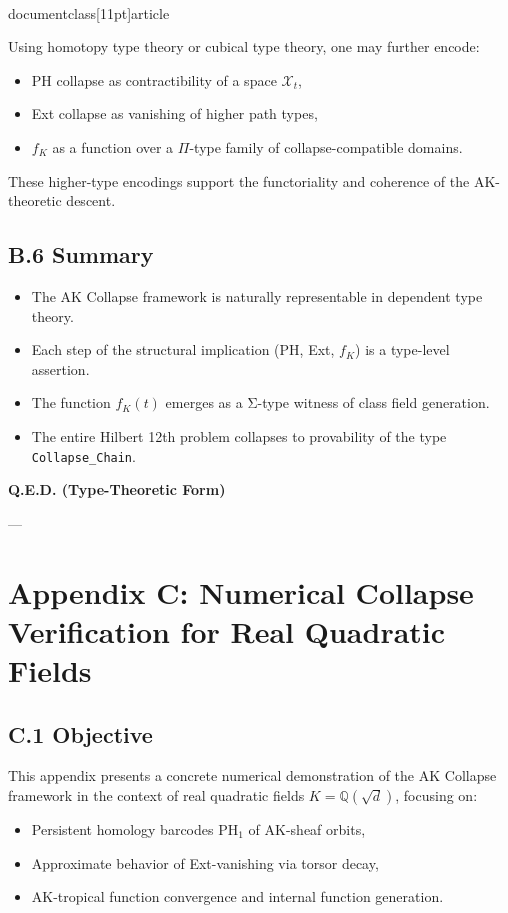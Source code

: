 \\documentclass[11pt]{article}
\begin{document}
Using homotopy type theory or cubical type theory, one may further encode:

\begin{itemize}
    \item PH collapse as contractibility of a space \( \mathcal{X}_t \),
    \item Ext collapse as vanishing of higher path types,
    \item \( f_K \) as a function over a \(\Pi\)-type family of collapse-compatible domains.
\end{itemize}

These higher-type encodings support the functoriality and coherence of the AK-theoretic descent.

\subsection*{B.6 Summary}

\begin{itemize}
    \item The AK Collapse framework is naturally representable in dependent type theory.
    \item Each step of the structural implication (PH, Ext, \( f_K \)) is a type-level assertion.
    \item The function \( f_K(t) \) emerges as a Σ-type witness of class field generation.
    \item The entire Hilbert 12th problem collapses to provability of the type \texttt{Collapse\_Chain}.
\end{itemize}

\begin{center}
\LARGE \textbf{Q.E.D. (Type-Theoretic Form)}
\end{center}


---


\section*{Appendix C: Numerical Collapse Verification for Real Quadratic Fields}

\subsection*{C.1 Objective}

This appendix presents a concrete numerical demonstration of the AK Collapse framework  
in the context of real quadratic fields \( K = \mathbb{Q}(\sqrt{d}) \), focusing on:
\begin{itemize}
    \item Persistent homology barcodes \( \mathrm{PH}_1 \) of AK-sheaf orbits,
    \item Approximate behavior of Ext-vanishing via torsor decay,
    \item AK-tropical function convergence and internal function generation.
\end{itemize}
\end{document}
